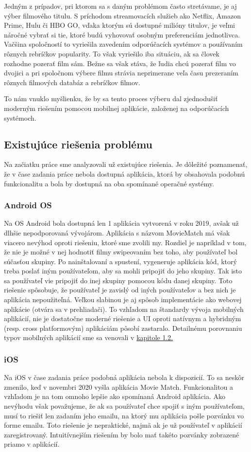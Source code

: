 Jedným z prípadov, pri ktorom sa s daným problémom často stretávame, je aj výber filmového titulu. S príchodom streamovacích služieb ako Netflix, Amazon Prime, Hulu či HBO GO, vďaka ktorým sú dostupné milióny titulov, je veľmi náročné vybrať si tie, ktoré budú vyhovovať osobným preferenciám jednotlivca. Vačšina spoločností to vyriešila zavedením odporúčacích systémov a používaním rôznych rebríčkov popularity. To však vyriešilo iba situáciu, ak sa človek rozhodne pozerať film sám. Bežne sa však stáva, že ľudia chcú pozerať film vo dvojici a pri spoločnom výbere filmu strávia neprimerane veľa času prezeraním rôznych filmových databáz a rebríčkov filmov. 

To nám vnuklo myšlienku, že by sa tento proces výberu dal zjednodušiť moderným riešením pomocou mobilnej aplikácie, založenej na odporúčacích systémoch.

\subsection{Existujúce riešenia problému}
Na začiatku práce sme analyzovali už existujúce riešenia. Je dôležité poznamenať, že v čase zadania práce nebola dostupná aplikácia, ktorá by obsahovala podobnú funkcionalitu a bola by dostupná na oba spomínané operačné systémy. 
\subsubsection{Android OS}
Na OS Android bola dostupná len 1 aplikácia vytvorená v roku 2019, avšak už dlhšie nepodporovaná vývojárom. Aplikácia s názvom MovieMatch má však viacero nevýhod oproti riešeniu, ktoré sme zvolili my. Rozdiel je napríklad v tom, že nie je možné v nej hodnotiť filmy swipeovaním bez toho, aby používateľ bol súčasťou skupiny. Po nainštalovaní a spustení, vygeneruje aplikácia kód, ktorý treba poslať iným používateľom, aby sa mohli pripojiť do jeho skupiny. Tak isto sa používateľ vie pripojiť do inej skupiny pomocou kódu danej skupiny. Toto riešenie spôsobuje, že používateľ je zavislý od iných používateľov a bez nich je aplikácia nepoužiteľná. Veľkou slabinou je aj spôsob implementácie ako webovej aplikácie (otvára sa v prehliadači). To vzhľadom na štandardy vývoja mobilných aplikácií, nie je dostatočne moderné riešenie a UI oproti natívnym a hybridným (resp. cross platformovým) aplikáciám pôsobí zastaralo. Detailnému porovnaniu typov mobilných aplikácií sme sa venovali v \hyperref[sec:typy aplikacii]{kapitole 1.2.}
\subsubsection{iOS}
Na iOS v čase zadania práce podobná aplikácia nebola k dispozicií. To sa neskôr zmenilo, keď v novembri 2020 vyšla aplikácia Movie Match. Funkcionalitou a vzhľadom je na tom omnoho lepšie ako spomínaná Android aplikácia. Ako nevýhodu však považujeme, že ak sa používateľ chce spojiť s iným používateľom, musí to riešiť len zadaním jeho emailu, na ktorý mu aplikácia pošle pozvánku vo forme emailu. Toto riešenie je nepraktické, najmä ak je už používateľ v aplikácií zaregistrovaný. Intuitívnejším riešením by bolo mať takéto pozvánky zobrazené priamo v aplikácií. 


